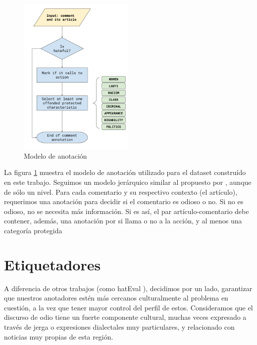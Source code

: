 %
%
%



\begin{figure}
    \centering
    \includegraphics[width=0.5\textwidth]{img/Annotation Model.png}
    \caption{Modelo de anotación}
    \label{fig:annotation_model}
\end{figure}


La figura \ref{fig:annotation_model} muestra el modelo de anotación utilizado para el dataset construído en este trabajo. Seguimos un modelo jerárquico similar al propuesto por \citet{zampieri2019predicting}, aunque de sólo un nivel. Para cada comentario y su respectivo contexto (el artículo), requerimos una anotación  para decidir si el comentario es odioso o no. Si no es odioso, no se necesita más información. Si es así, el par artículo-comentario debe contener, además, una anotación por si llama o no a la acción, y al menos una categoría protegida





\section{Etiquetadores}

A diferencia de otros trabajos (como hatEval \cite{hateval2019semeval}), decidimos por un lado, garantizar que nuestros anotadores estén más cercanos culturalmente al problema en cuestión, a la vez que tener mayor control del perfil de estos. Consideramos que el discurso de odio tiene un fuerte componente cultural, muchas veces expresado a través de jerga o expresiones dialectales muy particulares, y relacionado con noticias muy propias de esta región.


